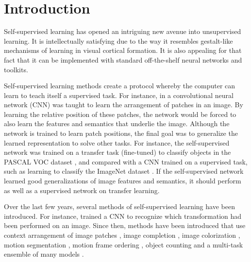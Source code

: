 \documentclass[10pt,twocolumn,letterpaper]{article}
\begin{document}
\section{Introduction}

Self-supervised learning has opened an intriguing new avenue into unsupervised learning. It is intellectually satisfying due to the way it resembles gestalt-like mechanisms of learning in visual cortical formation. It is also appealing for that fact that it can be implemented with standard off-the-shelf neural networks and toolkits.

Self-supervised learning methods create a protocol whereby the computer can learn to teach itself a supervised task. For instance, in \cite{Doersch15} a convolutional neural network (CNN) was taught to learn the arrangement of patches in an image. By learning the relative position of these patches, the network would be forced to also learn the features and semantics that underlie the image. Although the network is trained to learn patch positions, the final goal was to generalize the learned representation to solve other tasks. For instance, the self-supervised network was trained on a transfer task (fine-tuned) to classify objects in the PASCAL VOC dataset \cite{Everingham10}, and compared with a CNN trained on a supervised task, such as learning to classify the ImageNet dataset \cite{Imagenet09}. If the self-supervised network learned good generalizations of image features and semantics, it should perform as well as a supervised network on transfer learning. 

Over the last few years, several methods of self-supervised learning have been introduced. For instance, \cite{Dosovitskiy15} trained a CNN to recognize which transformation had been performed on an image. Since then, methods have been introduced that use context arrangement of image patches \cite{Doersch15,Noroozi16a}, image completion \cite{Pathak16}, image colorization \cite{Zhang17,Zhang16,Larsson17}, motion segmentation \cite{Pathak17}, motion frame ordering \cite{Wang15b,Wang17,Lee17}, object counting \cite{Noroozi17} and a multi-task ensemble of many models \cite{Doersch17,Kim18}. 
\end{document}
